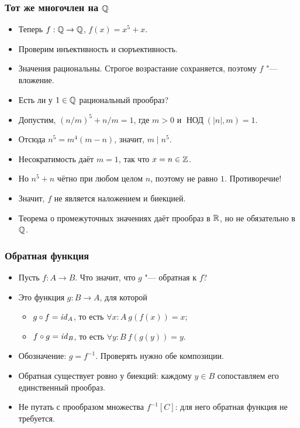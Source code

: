 \documentclass[10pt]{beamer}
\begin{document}
\begin{frame}
    \frametitle{Тот же многочлен на $\mathbb{Q}$}
    \begin{itemize}
        \item Теперь $f:\mathbb{Q}\to\mathbb{Q}$, $f(x)=x^5+x$.
        \item Проверим инъективность и сюръективность.
        \item<2-> Значения рациональны. Строгое возрастание сохраняется, поэтому $f$ "--- вложение.
        \item<3-> Есть ли у $1\in\mathbb{Q}$ рациональный прообраз?
        \item<4-> Допустим, $(n/m)^5+n/m=1$, где $m>0$ и $\operatorname{\text{НОД}}(|n|,m)=1$. 
        \item<6-> Отсюда $n^5=m^4(m-n)$, значит, $m\mid n^5$.
        \item<7-> Несократимость даёт $m=1$, так что $x=n\in\mathbb{Z}$.
        \item<8-> Но $n^5+n$ чётно при любом целом $n$, поэтому не равно $1$. Противоречие!
        \item<9-> Значит, $f$ не является наложением и биекцией.
        \item<10-> Теорема о промежуточных значениях даёт прообраз в $\mathbb{R}$, но не обязательно в $\mathbb{Q}$.
    \end{itemize}
\end{frame}

\begin{frame}
    \frametitle{Обратная функция}
    \begin{itemize}
        \item Пусть $f:A\to B$. Что значит, что $g$ "--- обратная к $f$?
        \item<2-> Это функция $g:B\to A$, для которой
        \begin{itemize}
            \item<3-> $g\circ f=\mathit{id}_A$, то есть $\forall x:A~g(f(x))=x$;
            \item<4-> $f\circ g=\mathit{id}_B$, то есть $\forall y:B~f(g(y))=y$.
        \end{itemize}
        \item<5-> Обозначение: $g=f^{-1}$. Проверять нужно обе композиции.
        \item<6-> Обратная существует ровно у биекций: каждому $y\in B$ сопоставляем его единственный прообраз.
        \item<7-> Не путать с прообразом множества $f^{-1}[C]$: для него обратная функция не требуется.
    \end{itemize}
\end{frame}
\end{document}
